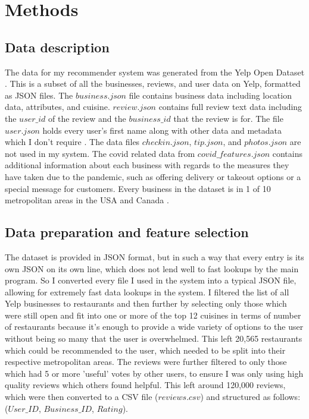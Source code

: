 \documentclass[conference]{IEEEtran}
\begin{document}
\section{Methods}

\subsection{Data description}
The data for my recommender system was generated from the Yelp Open Dataset \cite{YelpDataset}. 
This is a subset of all the businesses, reviews, and user data on Yelp, formatted as JSON files. 
The $business.json$ file contains business data including location data, attributes, and cuisine. 
$review.json$ contains full review text data including the $user\_id$ of the review and the $business\_id$ 
that the review is for. 
The file $user.json$ holds every user's first name along with other data and metadata which I don't 
require \cite{YelpDataset}. 
The data files $checkin.json$, $tip.json$, and $photos.json$ are not used in my system. 
The covid related data from $covid\_features.json$ contains additional information about each business with regards to 
the measures they have taken due to the pandemic, such as offering delivery or takeout options or a 
special message for customers. 
Every business in the dataset is in 1 of 10 metropolitan areas in the USA and Canada \cite{YelpDataset}. 

\subsection{Data preparation and feature selection}
The dataset is provided in JSON format, but in such a way that every entry is its own JSON on its own line, 
which does not lend well to fast lookups by the main program. 
So I converted every file I used in the system into a typical JSON file, allowing for extremely fast 
data lookups in the system. 
I filtered the list of all Yelp businesses to restaurants and then further by selecting only those which were still 
open and fit into one or more of the top 12 cuisines in terms of number of restaurants because it's enough to provide 
a wide variety of options to the user without being so many that the user is overwhelmed. 
This left 20,565 restaurants which could be recommended to the user, which needed to be split into their respective 
metropolitan areas. 
The reviews were further filtered to only those which had 5 or more 'useful' votes by other users, 
to ensure I was only using high quality reviews which others found helpful. 
This left around 120,000 reviews, which were then converted to a CSV file ($reviews.csv$) and structured as 
follows: ($User\_ID$, $Business\_ID$, $Rating$). 
\end{document}
